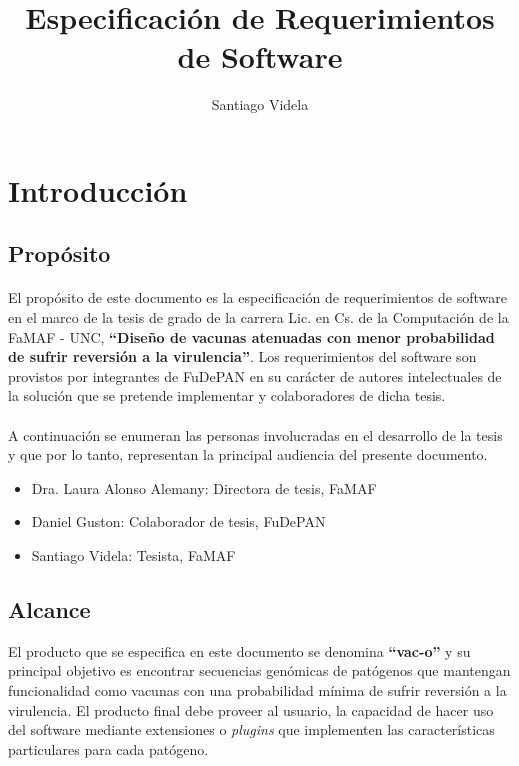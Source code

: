 \documentclass[10pt,a4paper]{article}
\author{Santiago Videla}
\title{Especificaci\'on de Requerimientos de Software}
\begin{document}
\maketitle
\pagebreak
\tableofcontents
\pagebreak

\section{Introducci\'on}
  \subsection{Prop\'osito}
  \paragraph{}
  El prop\'osito de este documento es la especificaci\'on de requerimientos de software en el marco de la tesis de grado de la carrera Lic. en Cs. de la Computaci\'on de la FaMAF - UNC, \textbf{``Dise\~no de vacunas atenuadas con menor probabilidad de sufrir reversi\'on a la virulencia''}. Los requerimientos del software son provistos por integrantes de FuDePAN en su car\'acter de autores intelectuales de la soluci\'on que se pretende implementar y colaboradores de dicha tesis.

  \paragraph{}
  A continuaci\'on se enumeran las personas involucradas en el desarrollo de la tesis y que por lo tanto, representan la principal audiencia del presente documento.
  \begin{itemize}
  \item Dra. Laura Alonso Alemany: Directora de tesis, FaMAF
  \item Daniel Guston: Colaborador de tesis, FuDePAN
  \item Santiago Videla: Tesista, FaMAF
  \end{itemize}  
 
  \subsection{Alcance}
  El producto que se especifica en este documento se denomina \textbf{``vac-o''} y su principal objetivo es encontrar secuencias gen\'omicas de pat\'ogenos que mantengan funcionalidad como vacunas con una probabilidad m\'inima de sufrir reversi\'on a la virulencia. El producto final debe proveer al usuario, la capacidad de hacer uso del software mediante extensiones o \textit{plugins} que implementen las caracter\'isticas particulares para cada pat\'ogeno. 
  
\end{document}
